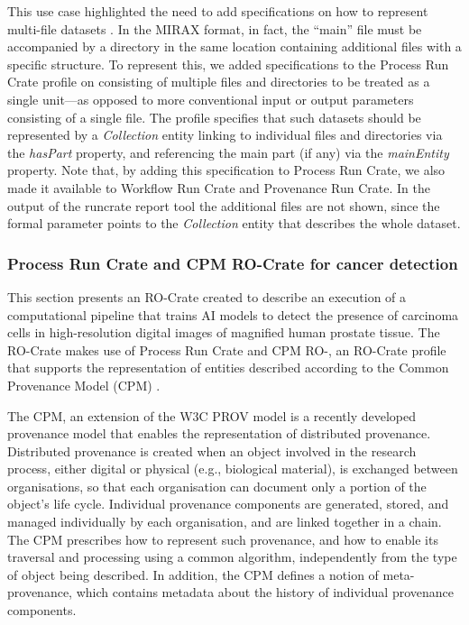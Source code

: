This use case highlighted the need to add specifications on how to represent multi-file datasets \cite[section Representing multi-file objects]{WRROC 2023a}. In the MIRAX format, in fact, the ``main'' file must be accompanied by a directory in the same location containing additional files with a specific structure.
To represent this, we added specifications to the Process Run Crate profile on  consisting of multiple files and directories to be treated as a single unit---as opposed to more conventional input or output parameters consisting of a single file. The profile specifies that such datasets should be represented by a \emph{Collection} entity linking to individual files and directories via the \emph{hasPart} property, and referencing the main part (if any) via the \emph{mainEntity} property. Note that, by adding this specification to Process Run Crate, we also made it available to Workflow Run Crate and Provenance Run Crate. In the output of the runcrate report tool the additional files are not shown, since the formal parameter points to the \emph{Collection} entity that describes the whole dataset.

\subsubsection{Process Run Crate and CPM RO-Crate for cancer detection}\label{ch54:process-run-crate-and-cpm-ro-crate-for-cancer-detection}

This section presents an RO-Crate created to describe an execution of a computational pipeline that trains AI models to detect the presence of carcinoma cells in high-resolution digital images of magnified human prostate tissue.
The RO-Crate makes use of Process Run Crate and CPM RO-, an RO-Crate profile that supports the representation of entities described according to the Common Provenance Model (CPM) \cite{Wittner 2022,Wittner 2023b}. 

The CPM, an extension of the W3C PROV model \cite{Moreau 2013} is a recently developed provenance model that enables the representation of distributed provenance. 
Distributed provenance is created when an object involved in the research process, either digital or physical (e.g., biological material), is exchanged between organisations, so that each organisation can document only a portion of the object’s life cycle. 
Individual provenance components are generated, stored, and managed individually by each organisation, and are linked together in a chain. 
The CPM prescribes how to represent such provenance, and how to enable its traversal and processing using a common algorithm, independently from the type of object being described. 
In addition, the CPM defines a notion of meta-provenance, which contains metadata about the history of individual provenance components. 

